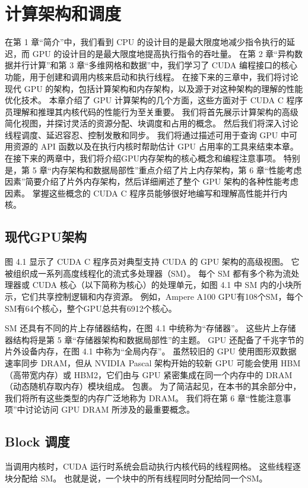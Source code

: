 \section{计算架构和调度}
在第 1 章“简介”中，我们看到 CPU 的设计目的是最大限度地减少指令执行的延迟，而 GPU 的设计目的是最大限度地提高执行指令的吞吐量。 在第 2 章“异构数据并行计算”和第 3 章“多维网格和数据”中，我们学习了 CUDA 编程接口的核心功能，用于创建和调用内核来启动和执行线程。 在接下来的三章中，我们将讨论现代 GPU 的架构，包括计算架构和内存架构，以及源于对这种架构的理解的性能优化技术。 本章介绍了 GPU 计算架构的几个方面，这些方面对于 CUDA C 程序员理解和推理其内核代码的性能行为至关重要。 我们将首先展示计算架构的高级简化视图，并探讨灵活的资源分配、块调度和占用的概念。 然后我们将深入讨论线程调度、延迟容忍、控制发散和同步。 我们将通过描述可用于查询 GPU 中可用资源的 API 函数以及在执行内核时帮助估计 GPU 占用率的工具来结束本章。 在接下来的两章中，我们将介绍GPU内存架构的核心概念和编程注意事项。 特别是，第 5 章“内存架构和数据局部性”重点介绍了片上内存架构，第 6 章“性能考虑因素”简要介绍了片外内存架构，然后详细阐述了整个 GPU 架构的各种性能考虑因素。 掌握这些概念的 CUDA C 程序员能够很好地编写和理解高性能并行内核。

\subsection{现代GPU架构}
图 4.1 显示了 CUDA C 程序员对典型支持 CUDA 的 GPU 架构的高级视图。 它被组织成一系列高度线程化的流式多处理器（SM）。 每个 SM 都有多个称为流处理器或 CUDA 核心（以下简称为核心）的处理单元，如图 4.1 中 SM 内的小块所示，它们共享控制逻辑和内存资源。 例如，Ampere A100 GPU有108个SM，每个SM有64个核心，整个GPU总共有6912个核心。

SM 还具有不同的片上存储器结构，在图 4.1 中统称为“存储器”。 这些片上存储器结构将是第 5 章“存储器架构和数据局部性”的主题。 GPU 还配备了千兆字节的片外设备内存，在图 4.1 中称为“全局内存”。 虽然较旧的 GPU 使用图形双数据速率同步 DRAM，但从 NVIDIA Pascal 架构开始的较新 GPU 可能会使用 HBM（高带宽内存）或 HBM2，它们由与 GPU 紧密集成在同一个内存中的 DRAM（动态随机存取内存）模块组成。 包裹。 为了简洁起见，在本书的其余部分中，我们将所有这些类型的内存广泛地称为 DRAM。 我们将在第 6 章“性能注意事项”中讨论访问 GPU DRAM 所涉及的最重要概念。

\subsection{Block 调度}
当调用内核时，CUDA 运行时系统会启动执行内核代码的线程网格。 这些线程逐块分配给 SM。 也就是说，一个块中的所有线程同时分配给同一个SM。

